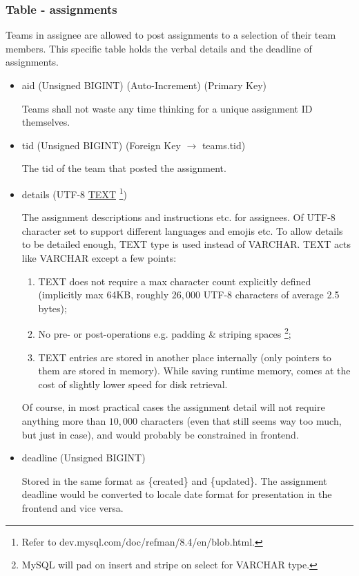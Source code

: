 \documentclass[12pt]{report}
\newcommand{\n}{\par}
\begin{document}
\subsubsection{Table - assignments} \label{data-layer.design.assignment-system.assignments}
Teams in assignee are allowed to post assignments to a selection of their team members.
This specific table holds the verbal details and the deadline of assignments.
\begin{itemize}
	\item aid (Unsigned BIGINT) (Auto-Increment) (Primary Key)\n
	      Teams shall not waste any time thinking for a unique assignment ID themselves.
	\item tid (Unsigned BIGINT) (Foreign Key $\rightarrow$ teams.tid)\n
	      The tid of the team that posted the assignment.
	\item details (UTF-8 \href{https://dev.mysql.com/doc/refman/8.4/en/blob.html}{TEXT}
	      \footnote{Refer to dev.mysql.com/doc/refman/8.4/en/blob.html.})\n
	      The assignment descriptions and instructions etc. for assignees.
	      Of UTF-8 character set to support different languages and emojis etc.
	      To allow details to be detailed enough, TEXT type is used instead of VARCHAR.
	      TEXT acts like VARCHAR except a few points:
	      \begin{enumerate}
		      \item TEXT does not require a max character count explicitly defined (implicitly max 64KB, roughly $26,000$ UTF-8 characters of average 2.5 bytes);
		      \item No pre- or post-operations e.g. padding \& striping spaces
		            \footnote{MySQL will pad on insert and stripe on select for VARCHAR type.};
		      \item TEXT entries are stored in another place internally (only pointers to them are stored in memory).
		            While saving runtime memory, comes at the cost of slightly lower speed for disk retrieval.
	      \end{enumerate}
	      Of course, in most practical cases the assignment detail will not require anything more than $10,000$ characters
	      (even that still seems way too much, but just in case), and would probably be constrained in frontend.
	\item deadline (Unsigned BIGINT)\n
	      Stored in the same format as \{created\} and \{updated\}.
	      The assignment deadline would be converted to locale date format for presentation in the frontend and vice versa.
\end{itemize}
\end{document}
